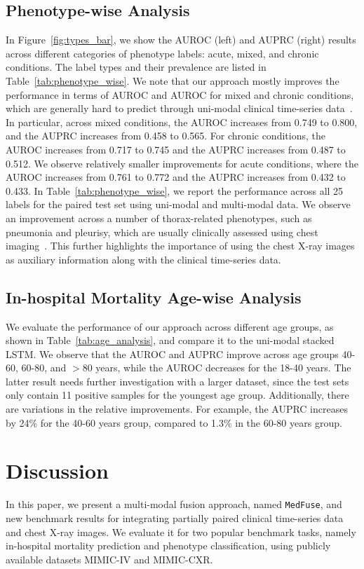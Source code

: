\documentclass[pmlr]{jmlr}
\begin{document}
\subsection{Phenotype-wise Analysis}
In Figure~\ref{fig:types_bar}, we show the AUROC (left) and AUPRC (right) results across different categories of phenotype labels: acute, mixed, and chronic conditions. The label types and their prevalence are listed in Table~\ref{tab:phenotype_wise}. We note that our approach mostly improves the performance in terms of AUROC and AUROC for mixed and chronic conditions, which are generally hard to predict through uni-modal clinical time-series data~\citep{benchhmark}. In particular, across mixed conditions, the AUROC increases from 0.749 to 0.800, and the AUPRC increases from 0.458 to 0.565. For chronic conditions, the AUROC increases from 0.717 to 0.745 and the AUPRC increases from 0.487 to 0.512. We observe relatively smaller improvements for acute conditions, where the AUROC increases from 0.761 to 0.772 and the AUPRC increases from 0.432 to 0.433. In Table~\ref{tab:phenotype_wise}, we report the performance across all 25 labels for the paired test set using uni-modal and multi-modal data. We observe an improvement across a number of thorax-related phenotypes, such as pneumonia and pleurisy, which are usually clinically assessed using chest imaging~\citep{long2017emergency}. This further highlights the importance of using the chest X-ray images as auxiliary information along with the clinical time-series data.

\vspace{-2mm}
\subsection{In-hospital Mortality Age-wise Analysis}
We evaluate the performance of our approach across different age groups, as shown in  Table~\ref{tab:age_analysis}, and compare it to the uni-modal stacked LSTM. We observe that the AUROC and AUPRC improve across age groups 40-60, 60-80, and $>$80 years, while the AUROC decreases for the 18-40 years. The latter result needs further investigation with a larger dataset, since the test sets only contain 11 positive samples for the youngest age group. Additionally, there are variations in the relative improvements. For example, the AUPRC increases by 24\% for the 40-60 years group, compared to 1.3\% in the 60-80 years group. 





\section{Discussion}
In this paper, we present a multi-modal fusion approach, named \texttt{MedFuse}, and new benchmark results for integrating partially paired clinical time-series data and chest X-ray images. We evaluate it for two popular benchmark tasks, namely in-hospital mortality prediction and phenotype classification, using publicly available datasets MIMIC-IV and MIMIC-CXR.  
\end{document}

